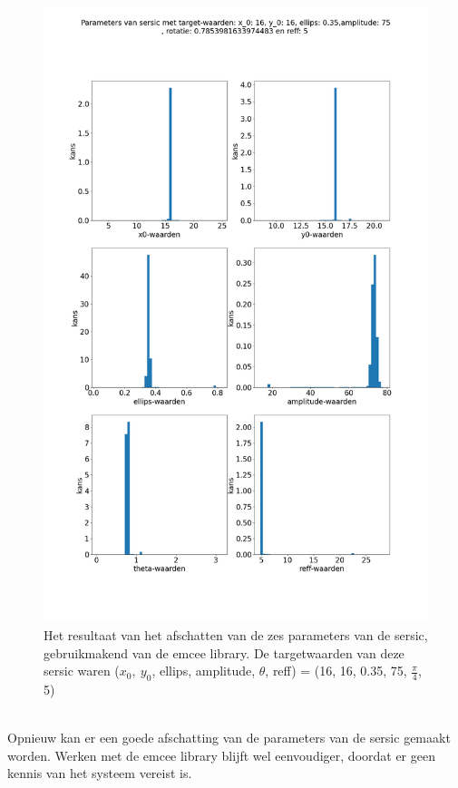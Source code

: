 \begin{figure}
    \centering
    \includegraphics[width=0.95\linewidth]{Figures/emcee_hist_12000_2300.png}
    \caption{Het resultaat van het afschatten van de zes parameters van de sersic, gebruikmakend van de emcee library. De targetwaarden van deze sersic waren ($x_0,\ y_0$, ellips, amplitude, $\theta$, reff) = (16, 16, 0.35, 75, $\frac{\pi}{4}$,  5)}
    \label{fig: emcee}
\end{figure}\mbox{}\\
Opnieuw kan er een goede afschatting van de parameters van de sersic gemaakt worden. Werken met de emcee library blijft wel eenvoudiger, doordat er geen kennis van het systeem vereist is.

